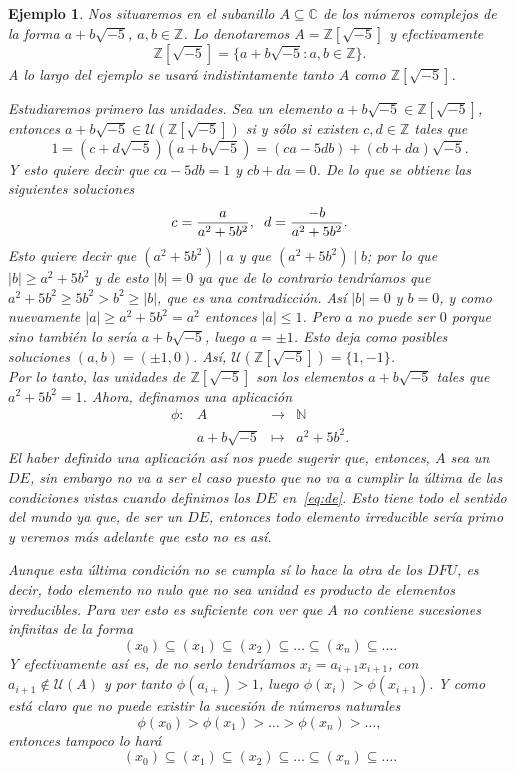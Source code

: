 \documentclass[12pt]{article}
\newtheorem{example}{Ejemplo}[theorem]
\begin{document}
\begin{example} Nos situaremos en el subanillo $A \subseteq \mathbb{C}$ de los números complejos de la forma $a +b\sqrt{-5}$, $a,b \in \mathbb{Z}$. Lo denotaremos $A = \mathbb{Z}[\sqrt{-5}]$ y efectivamente $$\mathbb{Z}[\sqrt{-5}] = \lbrace a + b\sqrt{-5} : a,b \in \mathbb{Z} \rbrace.$$ A lo largo del ejemplo se usará indistintamente tanto $A$ como $\mathbb{Z}[\sqrt{-5}]$. 

Estudiaremos primero las unidades. Sea un elemento $a +b\sqrt{-5} \in \mathbb{Z}[\sqrt{-5}]$, entonces $a +b\sqrt{-5} \in \mathcal{U}(\mathbb{Z}[\sqrt{-5}])$ si y sólo si existen $c,d \in \mathbb{Z}$ tales que $$1 = (c + d\sqrt{-5})(a +b\sqrt{-5}) = (ca-5db) + (cb + da)\sqrt{-5}.$$ Y esto quiere decir que $ca-5db = 1$ y $cb + da = 0$. De lo que se obtiene las siguientes soluciones $$c = \dfrac{a}{a^{2}+5b^{2}}, \hspace{0.2cm} d = \dfrac{-b}{a^{2}+5b^{2}}.$$ Esto quiere decir que $(a^{2}+5b^{2}) \mid a$ y que $(a^{2} + 5b^{2}) \mid b$; por lo que $|b| \geq a^{2}+5b^{2}$ y de esto $|b| = 0$ ya que de lo contrario tendríamos que $a^{2} + 5b^{2} \geq 5b^{2} > b^{2} \geq |b|$, que es una contradicción. Así $|b| = 0$ y $b = 0$, y como nuevamente $|a| \geq a^{2} + 5b^{2} = a^{2}$ entonces $|a| \leq 1$. Pero $a$ no puede ser $0$ porque sino también lo sería $a + b\sqrt{-5}$, luego $a = \pm 1$. Esto deja como posibles soluciones $(a,b) = (\pm 1, 0).$ Así, $\mathcal{U} (\mathbb{Z}[\sqrt{-5}]) = \lbrace 1, -1 \rbrace$.\vspace{0.3cm}\\
 
Por lo tanto, las unidades de $\mathbb{Z}[\sqrt{-5}]$ son los elementos $a + b\sqrt{-5}$ tales que $a^{2} + 5b^{2} = 1$. Ahora, definamos una aplicación $$\begin{array}{rccl}
\phi \colon &A&\longrightarrow &\mathbb{N} \\
&a+b\sqrt{-5}& \longmapsto &a^{2}+ 5b^{2}.
\end{array}
$$ El haber definido una aplicación así nos puede sugerir que, entonces, $A$ sea un $DE$, sin embargo no va a ser el caso puesto que no va a cumplir la última de las condiciones vistas cuando definimos los $DE$ en~\ref{eq:de}. Esto tiene todo el sentido del mundo ya que, de ser un $DE$, entonces todo elemento irreducible sería primo y veremos más adelante que esto no es así.

Aunque esta última condición no se cumpla sí lo hace la otra de los $DFU$, es decir, todo elemento no nulo que no sea unidad es producto de elementos irreducibles. Para ver esto es suficiente con ver que $A$ no contiene sucesiones infinitas de la forma $$(x_{0}) \subseteq (x_{1}) \subseteq (x_{2}) \subseteq \ldots \subseteq (x_{n}) \subseteq \ldots.$$ Y efectivamente así es, de no serlo tendríamos $x_{i} = a_{i+1}x_{i+1}$, con $a_{i+1} \notin  \mathcal{U}(A)$ y por tanto $\phi (a_{i+}) > 1$, luego $\phi (x_{i}) > \phi (x_{i+1}).$ Y como está claro que no puede existir la sucesión de números naturales $$\phi(x_{0}) > \phi (x_{1}) > \ldots > \phi(x_{n}) > \ldots, $$ entonces tampoco lo hará $$(x_{0}) \subseteq (x_{1}) \subseteq (x_{2}) \subseteq \ldots \subseteq (x_{n}) \subseteq \ldots.$$ 


\end{example}
\end{document}

